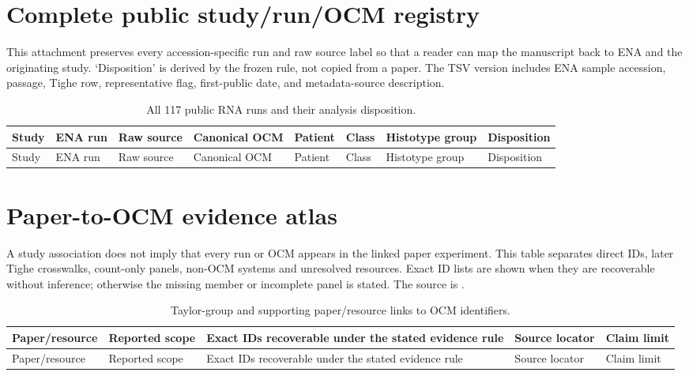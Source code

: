 \documentclass[10pt]{article}
\begin{document}
\section{Complete public study/run/OCM registry}
\label{app:studyregistry}

This attachment preserves every accession-specific run and raw source label so
that a reader can map the manuscript back to ENA and the originating study.
`Disposition' is derived by the frozen rule, not copied from a paper.  The TSV
version includes ENA sample accession, passage, Tighe row, representative flag,
first-public date, and metadata-source description.

\scriptsize
\begin{longtable}{p{1.65cm}p{1.75cm}p{2.0cm}p{1.55cm}p{1.3cm}p{1.15cm}p{1.4cm}p{2.5cm}}
\caption{All 117 public RNA runs and their analysis disposition.}\label{tab:registry}\\
\toprule
Study & ENA run & Raw source & Canonical OCM & Patient & Class & Histotype group & Disposition \\
\midrule
\endfirsthead
\toprule
Study & ENA run & Raw source & Canonical OCM & Patient & Class & Histotype group & Disposition \\
\midrule
\endhead

\bottomrule
\end{longtable}
\normalsize

\section{Paper-to-OCM evidence atlas}
\label{app:paperocm}

A study association does not imply that every run or OCM appears in the linked
paper experiment.  This table separates direct IDs, later Tighe crosswalks,
count-only panels, non-OCM systems and unresolved resources.  Exact ID lists are
shown when they are recoverable without inference; otherwise the missing member
or incomplete panel is stated.  The source is
.

\scriptsize
\begin{longtable}{p{1.9cm}p{2.0cm}p{4.5cm}p{3.0cm}p{3.0cm}}
\caption{Taylor-group and supporting paper/resource links to OCM identifiers.}\label{tab:paperocm}\\
\toprule
Paper/resource & Reported scope & Exact IDs recoverable under the stated evidence rule & Source locator & Claim limit \\
\midrule
\endfirsthead
\toprule
Paper/resource & Reported scope & Exact IDs recoverable under the stated evidence rule & Source locator & Claim limit \\
\midrule
\endhead

\bottomrule
\end{longtable}
\normalsize
\end{document}
